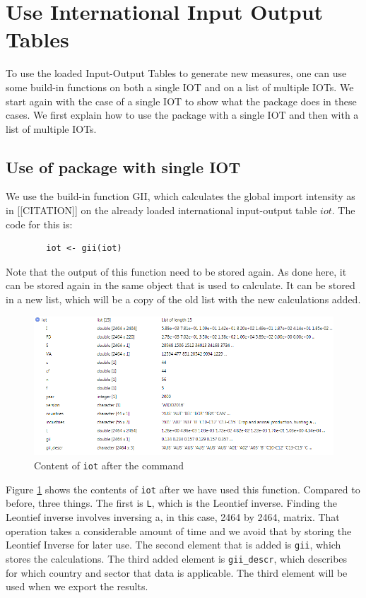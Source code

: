 \documentclass[10pt,a4paper]{paper}
\begin{document}
	
	\section{Use International Input Output Tables}
	To use the loaded Input-Output Tables to generate new measures, one can use some build-in functions on both a single IOT and on a list of multiple IOTs. We start again with the case of a single IOT to show what the package does in these cases. We first explain how to use the package with a single IOT and then with a list of multiple IOTs.
	
	\subsection{Use of package with single IOT}
	We use the build-in function GII, which calculates the global import intensity as in [[CITATION]] on the already loaded international input-output table $iot$. The code for this is:
	\begin{verbatim}
		iot <- gii(iot)
	\end{verbatim}
	Note that the output of this function need to be stored again. As done here, it can be stored again in the same object that is used to calculate. It can be stored in a new list, which will be a copy of the old list with the new calculations added.
	\begin{figure}
	\centering
	\includegraphics[width=1\linewidth]{content_iot_function}
	\caption{Content of \texttt{iot} after the command}
	\label{fig:contentiotfunction}
	\end{figure}

	Figure \ref{fig:contentiotfunction} shows the contents of \texttt{iot} after we have used this function. Compared to before, three things. The first is \texttt{L}, which is the Leontief inverse. Finding the Leontief inverse involves inversing a, in this case, 2464 by 2464, matrix. That operation takes a considerable amount of time and we avoid that by storing the Leontief Inverse for later use. The second element that is added is \texttt{gii}, which stores the calculations. The third added element is \texttt{gii\_descr}, which describes for which country and sector that data is applicable. The third element will be used when we export the results.
	
\end{document}
